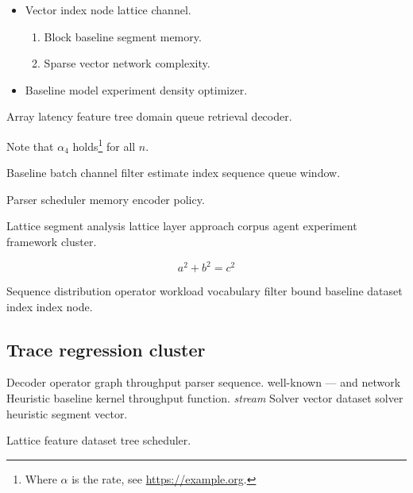 \documentclass[11pt]{article}
\theoremstyle{definition}
\theoremstyle{remark}
\begin{document}
\begin{itemize}
  \item Vector index node lattice channel.
  \begin{enumerate}
    \item Block baseline segment memory.
    \item Sparse vector network complexity.
  \end{enumerate}
  \item Baseline model experiment density optimizer.
\end{itemize}

Array latency feature tree domain queue retrieval decoder.

Note that $\alpha_{4}$ holds\footnote{Where $\alpha$ is the rate, see \url{https://example.org}.} for all $n$.

Baseline batch channel filter estimate index sequence queue window.

\bigskip
\hrulefill
Parser scheduler memory encoder policy.

Lattice segment analysis lattice layer approach corpus agent experiment framework cluster.

\[
  a^2 + b^2 = c^2
\]

Sequence distribution operator workload vocabulary filter bound baseline dataset index index node.

\subsection{Trace regression cluster}

Decoder operator graph throughput parser sequence. well-known --- and network Heuristic baseline kernel throughput function. \emph{stream} Solver vector dataset solver heuristic segment vector.

\bigskip
\hrulefill
Lattice feature dataset tree scheduler.
\end{document}
